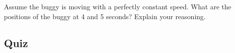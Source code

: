 \documentclass[]{exam}
\begin{document}
\begin{questions}

Assume the buggy is moving with a perfectly constant speed. What are the positions of the buggy at 4 and 5 seconds? Explain your reasoning.

\begin{solutionorbox}[5cm]
    
\end{solutionorbox}

\end{questions}

\clearpage

\subsection*{Quiz}
\end{document}
